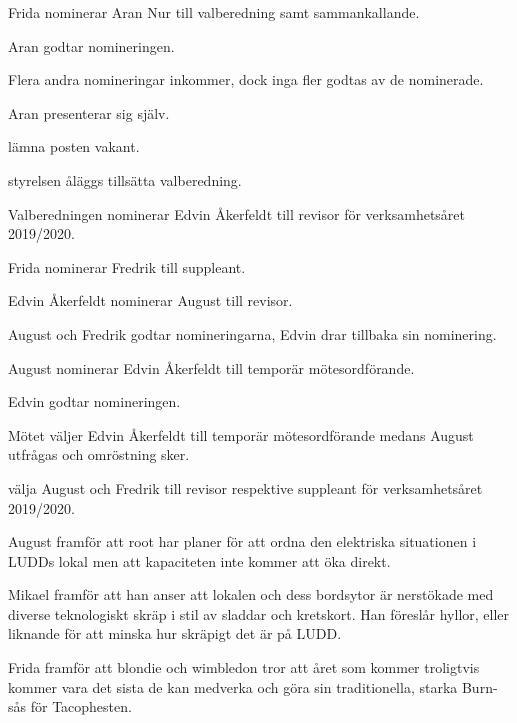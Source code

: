 \documentclass{protokoll}
\begin{document}
Frida nominerar Aran Nur till valberedning samt sammankallande. 

Aran godtar nomineringen. 

Flera andra nomineringar inkommer, dock inga fler godtas av de nominerade. 

Aran presenterar sig själv. 

\begin{beslut}
  \att lämna posten vakant. 
\end{beslut}

\begin{beslut}
  \att styrelsen åläggs tillsätta valberedning.
\end{beslut}

Valberedningen nominerar Edvin Åkerfeldt till revisor för verksamhetsåret 2019/2020.

Frida nominerar Fredrik till suppleant. 

Edvin Åkerfeldt nominerar August till revisor.

August och Fredrik godtar nomineringarna, Edvin drar tillbaka sin nominering. 

August nominerar Edvin Åkerfeldt till temporär mötesordförande. 

Edvin godtar nomineringen. 

Mötet väljer Edvin Åkerfeldt till temporär mötesordförande medans August
utfrågas och omröstning sker. 

\begin{beslut}
  \att välja August och Fredrik till revisor respektive suppleant för verksamhetsåret 2019/2020.
\end{beslut}

August framför att root har planer för att ordna den elektriska situationen
i LUDDs lokal men att kapaciteten inte kommer att öka direkt.

Mikael framför att han anser att lokalen och dess bordsytor är nerstökade med 
diverse teknologiskt skräp i stil av sladdar och kretskort. Han föreslår 
hyllor, eller liknande för att minska hur skräpigt det är på LUDD.

Frida framför att blondie och wimbledon tror att året som kommer troligtvis
kommer vara det sista de kan medverka och göra sin traditionella, starka 
Burn-sås för Tacophesten.
\end{document}
